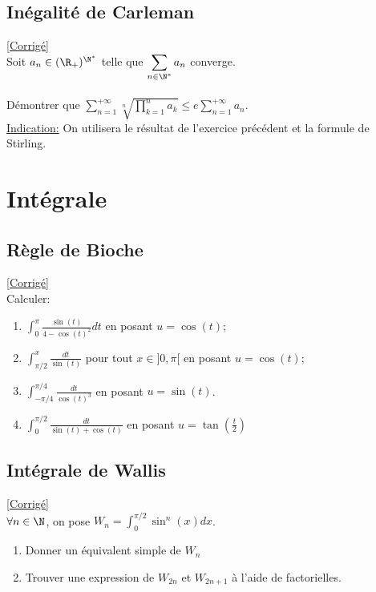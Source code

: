 \documentclass{book}
\begin{document}
	\section{Inégalité de Carleman }
	\label{Inégalité de Carleman}
	\textcolor{blue}{\hyperref[sec:inegalite-de-carleman]{[Corrigé]}}\\
	Soit $a_n \in (\R_+)^{\N^*}$ telle que $\displaystyle\sum\limits_{n\in \N^*} a_n$ converge.
	\\\\Démontrer que $\displaystyle\sum\limits_{n=1}^{+\infty}\sqrt[n]{\prod\limits_{k=1}^{n} a_k} \leq e\sum\limits_{n=1}^{+\infty} a_n$.
	\\ \underline{Indication:} On utilisera le résultat de l'exercice précédent et la formule de Stirling.
	
\chapter{Intégrale}
	\section{Règle de Bioche }
	\textcolor{blue}{\hyperref[Règle de Bioche corrigé]{[Corrigé]}}\\
	\label{bioche}
	\label{Règle de Bioche}
	Calculer:
	\begin{enumerate}
		\item $\displaystyle\int_0^\pi\frac{\sin(t)}{4-\cos(t)^2}dt$ en posant $u=\cos(t)$;
		\item $\displaystyle\int_{\pi/2}^x\frac{dt}{\sin(t)}$ pour tout $x\in]0,\pi[$ en posant $u=\cos(t)$;
		\item $\displaystyle\int_{-\pi/4}^{\pi/4} \frac{dt}{\cos(t)^3}$ en posant $u=\sin(t)$.
		\item $\displaystyle\int_0^{\pi/2}\frac{dt}{\sin(t)+\cos(t)}$ en posant $u=\displaystyle\tan\left(\frac{t}{2}\right)$
	\end{enumerate}
	
	\section{Intégrale de Wallis }
	\textcolor{blue}{\hyperref[Intégrale de Wallis corrigé]{[Corrigé]}}\\
	\label{wallis}
	\label{Intégrale de Wallis}
	$\forall n \in \N$, on pose $W_n=\displaystyle\int_0^{\pi/2}\sin^n(x)dx$.
	\begin{enumerate}
		\item Donner un équivalent simple de $W_n$
		\item Trouver une expression de $W_{2n}$ et $W_{2n+1}$ à l'aide de factorielles.
	\end{enumerate}
	
\end{document}
